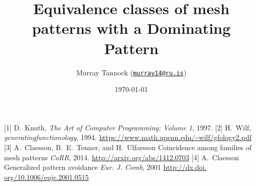 \documentclass[11pt, aspectratio=169]{beamer}
\title[Dominating Patterns]{Equivalence classes of mesh patterns with a Dominating Pattern}
\author[M.~Tannock]{Murray Tannock (\href{mailto:murray14@ru.is}{\texttt{murray14@ru.is}})}
\institute[Reykjavik University]
{
\texttt{[image: rulogo]}
}
\date{\today}
\begin{document}
  \begin{frame}
    \titlepage
  \end{frame}





\begin{thebibliography}{10}
  [1]
    D.~Knuth,
    \newblock
    \newblock \emph{The Art of Computer Programming: Volume 1}, 1997.
  [2]
    H.~Wilf,
    \newblock
    \newblock \emph{generatingfunctionology}, 1994.
    \url{https://www.math.upenn.edu/~wilf/gfology2.pdf}
  [3]
    A.~Claesson, B.~E.~Tenner, and H.~Ulfarsson
    \newblock Coincidence among families of mesh patterns
    \newblock \emph{CoRR}, 2014.
    \url{http://arxiv.org/abs/1412.0703}
  [4]
   A.~Claesson
   \newblock Generalized pattern avoidance
   \newblock \emph{Eur. J. Comb}, 2001
   \url{http://dx.doi. org/10.1006/eujc.2001.0515}
  \end{thebibliography}
\end{document}
